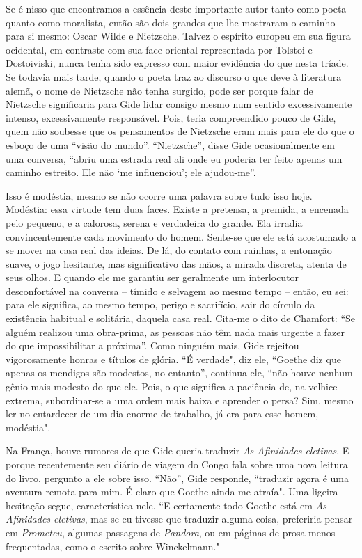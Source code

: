 Se é nisso que encontramos a essência deste importante autor tanto como
poeta quanto como moralista, então são dois grandes que lhe mostraram o
caminho para si mesmo: Oscar Wilde e Nietzsche. Talvez o espírito
europeu em sua figura ocidental, em contraste com sua face oriental
representada por Tolstoi e Dostoiviski, nunca tenha sido expresso com
maior evidência do que nesta tríade. Se todavia mais tarde, quando o
poeta traz ao discurso o que deve à literatura alemã, o nome de
Nietzsche não tenha surgido, pode ser porque falar de Nietzsche
significaria para Gide lidar consigo mesmo num sentido excessivamente
intenso, excessivamente responsável. Pois, teria compreendido pouco de
Gide, quem não soubesse que os pensamentos de Nietzsche eram mais para
ele do que o esboço de uma ``visão do mundo''. ``Nietzsche'', disse Gide
ocasionalmente em uma conversa, ``abriu uma estrada real ali onde eu
poderia ter feito apenas um caminho estreito. Ele não `me influenciou';
ele ajudou-me''.

Isso é modéstia, mesmo se não ocorre uma palavra sobre tudo isso hoje.
Modéstia: essa virtude tem duas faces. Existe a pretensa, a premida, a
encenada pelo pequeno, e a calorosa, serena e verdadeira do grande. Ela
irradia convincentemente cada movimento do homem. Sente-se que ele está
acostumado a se mover na casa real das ideias. De lá, do contato com
rainhas, a entonação suave, o jogo hesitante, mas significativo das
mãos, a mirada discreta, atenta de seus olhos. E quando ele me garantiu
ser geralmente um interlocutor desconfortável na conversa -- tímido e
selvagem ao mesmo tempo -- então, eu sei: para ele significa, ao mesmo
tempo, perigo e sacrifício, sair do círculo da existência habitual e
solitária, daquela casa real. Cita-me o dito de Chamfort: ``Se alguém
realizou uma obra-prima, as pessoas não têm nada mais urgente a fazer do
que impossibilitar a próxima''. Como ninguém mais, Gide rejeitou
vigorosamente honras e títulos de glória. ``É verdade", diz ele,
``Goethe diz que apenas os mendigos são modestos, no entanto'', continua
ele, ``não houve nenhum gênio mais modesto do que ele. Pois, o que
significa a paciência de, na velhice extrema, subordinar-se a uma ordem
mais baixa e aprender o persa? Sim, mesmo ler no entardecer de um dia
enorme de trabalho, já era para esse homem, modéstia".

Na França, houve rumores de que Gide queria traduzir \emph{As Afinidades
eletivas}. E porque recentemente seu diário de viagem do Congo fala
sobre uma nova leitura do livro, pergunto a ele sobre isso. ``Não'',
Gide responde, ``traduzir agora é uma aventura remota para mim. É claro
que Goethe ainda me atraía". Uma ligeira hesitação segue, característica
nele. ``E certamente todo Goethe está em \emph{As} \emph{Afinidades
eletivas}, mas se eu tivesse que traduzir alguma coisa, preferiria
pensar em \emph{Prometeu}, algumas passagens de \emph{Pandora}, ou em
páginas de prosa menos frequentadas, como o escrito sobre Winckelmann."

